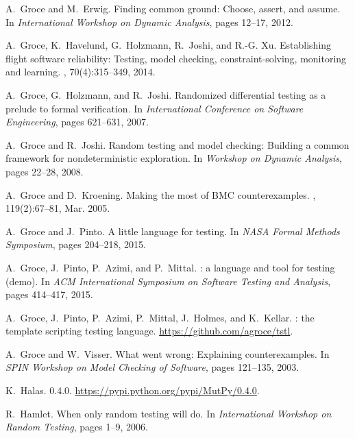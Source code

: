 \documentclass[format=sigconf]{acmart}
\begin{document}
\begin{thebibliography}{10}
A.~Groce and M.~Erwig.
\newblock Finding common ground: Choose, assert, and assume.
\newblock In {\em International Workshop on Dynamic Analysis}, pages 12--17,
  2012.

A.~Groce, K.~Havelund, G.~Holzmann, R.~Joshi, and R.-G. Xu.
\newblock Establishing flight software reliability: Testing, model checking,
  constraint-solving, monitoring and learning.
,
  70(4):315--349, 2014.

A.~Groce, G.~Holzmann, and R.~Joshi.
\newblock Randomized differential testing as a prelude to formal verification.
\newblock In {\em International Conference on Software Engineering}, pages
  621--631, 2007.

\vspace{4in}

A.~Groce and R.~Joshi.
\newblock Random testing and model checking: Building a common framework for
  nondeterministic exploration.
\newblock In {\em Workshop on Dynamic Analysis}, pages 22--28, 2008.

A.~Groce and D.~Kroening.
\newblock Making the most of {BMC} counterexamples.
, 119(2):67--81, Mar. 2005.

A.~Groce and J.~Pinto.
\newblock A little language for testing.
\newblock In {\em NASA Formal Methods Symposium}, pages 204--218, 2015.

A.~Groce, J.~Pinto, P.~Azimi, and P.~Mittal.
: a language and tool for testing (demo).
\newblock In {\em ACM International Symposium on Software Testing and
  Analysis}, pages 414--417, 2015.

A.~Groce, J.~Pinto, P.~Azimi, P.~Mittal, J.~Holmes, and K.~Kellar.
: the template scripting testing language.
\newblock \url{https://github.com/agroce/tstl}.

A.~Groce and W.~Visser.
\newblock What went wrong: Explaining counterexamples.
\newblock In {\em SPIN Workshop on Model Checking of Software}, pages 121--135,
  2003.

K.~Halas.
 0.4.0.
\newblock \url{https://pypi.python.org/pypi/MutPy/0.4.0}.

R.~Hamlet.
\newblock When only random testing will do.
\newblock In {\em International Workshop on Random Testing}, pages 1--9, 2006.


\end{thebibliography}
\end{document}
